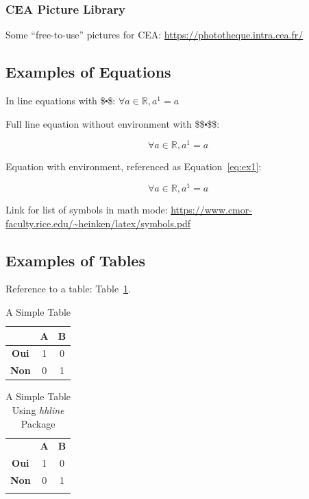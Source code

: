 \subsubsection{CEA Picture Library}

Some ``free-to-use'' pictures for CEA: \url{https://phototheque.intra.cea.fr/}

\subsection{Examples of Equations}

In line equations with \$$\centerdot$\$: $\forall a \in \mathbb{R}, a^1 = a$

\noindent Full line equation without environment with \$\$$\centerdot$\$\$:

$$\forall a \in \mathbb{R}, a^1 = a$$

\noindent Equation with environment, referenced as Equation~\ref{eq:ex1}:

\begin{equation}
    \label{eq:ex1}
    \forall a \in \mathbb{R}, a^1 = a
\end{equation}

Link for list of symbols in math mode: \url{https://www.cmor-faculty.rice.edu/~heinken/latex/symbols.pdf}

\subsection{Examples of Tables}

Reference to a table: Table~\ref{tab:ex1}.

\begin{table}[h] %
    \centering
    \begin{tabular}{c|cc}
        & \textbf{A} & \textbf{B} \\
        \hline
        \textbf{Oui} & 1 & 0 \\
        \textbf{Non} & 0 & 1
    \end{tabular}
    \caption{A Simple Table}
    \label{tab:ex1}
\end{table}

\begin{table}[h]
    \centering
    \begin{tabular}{|c||c|c|}
        \hhline{|-||-|-|}
        & \textbf{A} & \textbf{B} \\
        \hhline{=::==}
        \textbf{Oui} & 1 & 0 \\
        \hhline{|-||-|-|}
        \textbf{Non} & 0 & 1 \\
        \hhline{|-||-|-|}
    \end{tabular}
    \caption{A Simple Table Using \textit{hhline} Package}
    \label{tab:ex2}
\end{table}

